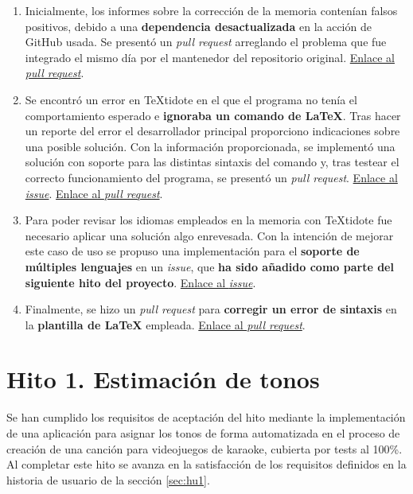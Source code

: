 \begin{enumerate}
	\item{Inicialmente, los informes sobre la corrección de la memoria contenían falsos positivos, debido a una \textbf{dependencia desactualizada} en la acción de GitHub usada. Se presentó un \textit{pull request} arreglando el problema que fue integrado el mismo día por el mantenedor del repositorio original. \href{https://github.com/ChiefGokhlayeh/textidote-action/pull/33}{Enlace al \textit{pull request}}.}
	
	\item{Se encontró un error en TeXtidote en el que el programa no tenía el comportamiento esperado e \textbf{ignoraba un comando de LaTeX}. Tras hacer un reporte del error el desarrollador principal proporciono indicaciones sobre una posible solución. Con la información proporcionada, se implementó una solución con soporte para las distintas sintaxis del comando y, tras testear el correcto funcionamiento del programa, se presentó un \textit{pull request}. \href{https://github.com/sylvainhalle/textidote/issues/208}{Enlace al \textit{issue}}. \href{https://github.com/sylvainhalle/textidote/pull/209}{Enlace al \textit{pull request}}.}
	
	\item{Para poder revisar los idiomas empleados en la memoria con TeXtidote fue necesario aplicar una solución algo enrevesada. Con la intención de mejorar este caso de uso se propuso una implementación para el \textbf{soporte de múltiples lenguajes} en un \textit{issue}, que \textbf{ha sido añadido como parte del siguiente hito del proyecto}. \href{https://github.com/sylvainhalle/textidote/issues/203}{Enlace al \textit{issue}}.}
	
	\item{Finalmente, se hizo un \textit{pull request} para \textbf{corregir un error de sintaxis} en la \textbf{plantilla de LaTeX} empleada. \href{https://github.com/JJ/plantilla-TFG-ETSIIT/pull/7}{Enlace al \textit{pull request}}.}
\end{enumerate}

\section{Hito 1. Estimación de tonos}

Se han cumplido los requisitos de aceptación del hito mediante la implementación de una aplicación para asignar los tonos de forma automatizada en el proceso de creación de una canción para videojuegos de karaoke, cubierta por tests al 100\%. Al completar este hito se avanza en la satisfacción de los requisitos definidos en la historia de usuario de la sección \ref{sec:hu1}.

